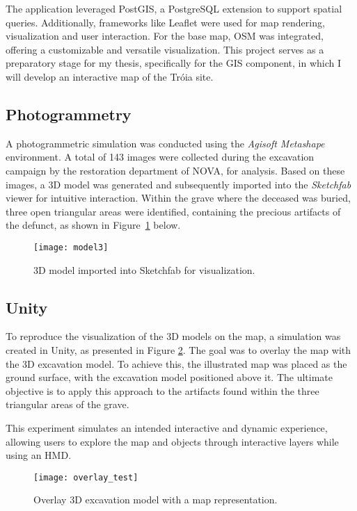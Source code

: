 The application leveraged PostGIS, a PostgreSQL extension to support spatial queries.
Additionally, frameworks like Leaflet were used for map rendering, visualization and user interaction. For the base map, \gls{OSM} was integrated, offering a customizable and versatile visualization. This project serves as a preparatory stage for my thesis, specifically for the \gls{GIS} component, in which I will develop an interactive map of the Tróia site.

\subsection{Photogrammetry}
\label{sec:photogrammetry_previous} 

A photogrammetric simulation was conducted using the \textit{Agisoft Metashape} environment. A total of 143 images were collected during the excavation campaign by the restoration department of NOVA, for analysis. 
Based on these images, a \gls{3D} model was generated and subsequently imported into the \textit{Sketchfab} viewer for intuitive interaction.
Within the grave where the deceased was buried, three open triangular areas were identified, containing the precious artifacts of the defunct, as shown in Figure~\ref{fig:model3} below.

\begin{figure}[h]
    \centering
    \texttt{[image: model3]}
    \caption{\gls{3D} model imported into Sketchfab for visualization.}
    \label{fig:model3}
\end{figure}


\subsection{Unity}
\label{sec:unity} 

To reproduce the visualization of the \gls{3D} models on the map, a simulation was created in Unity, as presented in Figure \ref{fig:overlay}. The goal was to overlay the map with the \gls{3D} excavation model.
To achieve this, the illustrated map was placed as the ground surface, with the excavation model positioned above it. The ultimate objective is to apply this approach to the artifacts found within the three triangular areas of the grave.

This experiment simulates an intended interactive and dynamic experience, allowing users to explore the map and objects through interactive layers while using an \gls{HMD}.


\begin{figure}[h]
    \centering
    \texttt{[image: overlay\_test]}
    \caption{Overlay \gls{3D} excavation model with a map representation.}
    \label{fig:overlay}
\end{figure}


